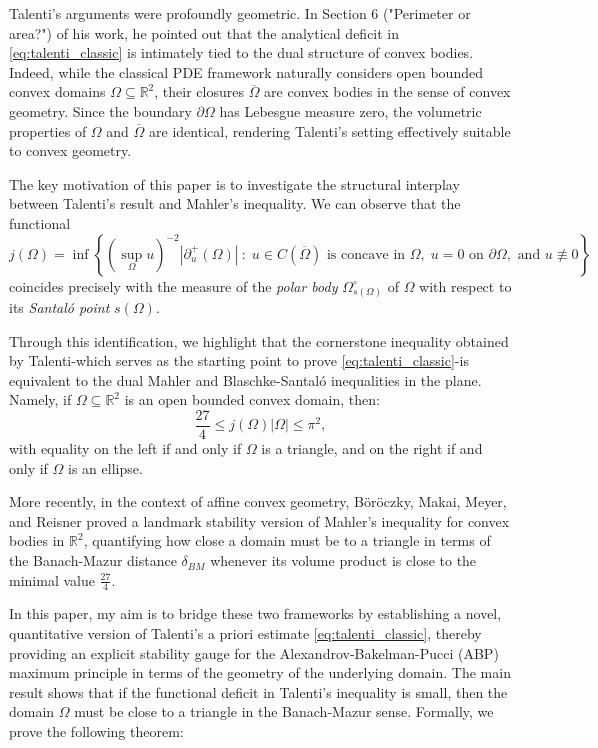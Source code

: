 \documentclass{article}
\numberwithin{equation}{section}
\begin{document}
\noindent Talenti's arguments were profoundly geometric. In Section 6 ("Perimeter or area?") of his work, he pointed out that the analytical deficit in \eqref{eq:talenti_classic} is intimately tied to the dual structure of convex bodies. Indeed, while the classical PDE framework naturally considers open bounded convex domains $\Omega \subseteq \mathbb{R}^2$, their closures $\overline{\Omega}$ are convex bodies in the sense of convex geometry. Since the boundary $\partial \Omega$ has Lebesgue measure zero, the volumetric properties of $\Omega$ and $\overline{\Omega}$ are identical, rendering Talenti's setting effectively suitable to convex geometry.

\noindent The key motivation of this paper is to investigate the structural interplay between Talenti's result and Mahler's inequality. We can observe that the functional
\begin{equation}\label{eq:functional_j}
j(\Omega) = \inf \left\{ (\sup_\Omega u)^{-2} |\partial^+_u(\Omega)| \ : \; u \in C(\overline{\Omega}) \text{ is concave in } \Omega, \; u = 0 \text{ on } \partial \Omega, \text{ and } u \not\equiv 0 \right\}
\end{equation}
coincides precisely with the measure of the \textit{polar body} $\Omega^\circ_{s(\Omega)}$ of $\Omega$ with respect to its \textit{Santaló point} $s(\Omega)$. 

\noindent Through this identification, we highlight that the cornerstone inequality obtained by Talenti-which serves as the starting point to prove \eqref{eq:talenti_classic}-is equivalent to the dual Mahler and Blaschke-Santaló inequalities in the plane. Namely, if $\Omega \subseteq \mathbb{R}^2$ is an open bounded convex domain, then:
\begin{equation}
\frac{27}{4} \leq j(\Omega)|\Omega| \leq \pi^2,
\end{equation}
with equality on the left if and only if $\Omega$ is a triangle, and on the right if and only if $\Omega$ is an ellipse.

\noindent More recently, in the context of affine convex geometry, Böröczky, Makai, Meyer, and Reisner \cite{boroczky2013} proved a landmark stability version of Mahler's inequality for convex bodies in $\mathbb{R}^2$, quantifying how close a domain must be to a triangle in terms of the Banach-Mazur distance $\delta_{BM}$ whenever its volume product is close to the minimal value $\frac{27}{4}$.

\noindent In this paper, my aim is to bridge these two frameworks by establishing a novel, quantitative version of Talenti's a priori estimate \eqref{eq:talenti_classic}, thereby providing an explicit stability gauge for the Alexandrov-Bakelman-Pucci (ABP) maximum principle in terms of the geometry of the underlying domain. The main result shows that if the functional deficit in Talenti's inequality is small, then the domain $\Omega$ must be close to a triangle in the Banach-Mazur sense. Formally, we prove the following theorem:
\end{document}
